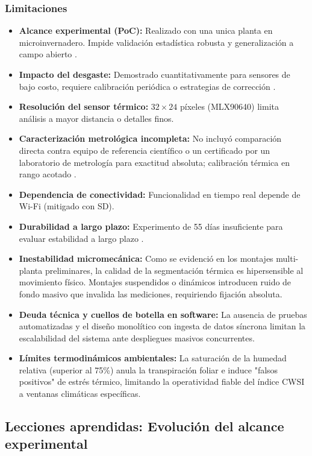 \subsubsection*{Limitaciones}
\begin{itemize}
    \item \textbf{Alcance experimental (PoC):} Realizado con una unica planta en microinvernadero. Impide validación estadística robusta y generalización a campo abierto .
    \item \textbf{Impacto del desgaste:} Demostrado cuantitativamente para sensores de bajo costo, requiere calibración periódica o estrategias de corrección .
    \item \textbf{Resolución del sensor térmico:} $32 \times 24$ píxeles (MLX90640) limita análisis a mayor distancia o detalles finos.
    \item \textbf{Caracterización metrológica incompleta:} No incluyó comparación directa contra equipo de referencia científico o un certificado por un laboratorio de metrología para exactitud absoluta; calibración térmica en rango acotado .
    \item \textbf{Dependencia de conectividad:} Funcionalidad en tiempo real depende de Wi-Fi (mitigado con SD).
    \item \textbf{Durabilidad a largo plazo:} Experimento de 55 días insuficiente para evaluar estabilidad a largo plazo .
    \item \textbf{Inestabilidad micromecánica:} Como se evidenció en los montajes multi-planta preliminares, la calidad de la segmentación térmica es hipersensible al movimiento físico. Montajes suspendidos o dinámicos introducen ruido de fondo masivo que invalida las mediciones, requiriendo fijación absoluta.
    \item \textbf{Deuda técnica y cuellos de botella en software:} La ausencia de pruebas automatizadas y el diseño monolítico con ingesta de datos síncrona limitan la escalabilidad del sistema ante despliegues masivos concurrentes.
    \item \textbf{Límites termodinámicos ambientales:} La saturación de la humedad relativa (superior al 75\%) anula la transpiración foliar e induce "falsos positivos" de estrés térmico, limitando la operatividad fiable del índice CWSI a ventanas climáticas específicas.
\end{itemize}

\subsection{Lecciones aprendidas: Evolución del alcance experimental}
\label{subsec:lecciones_aprendidas}


